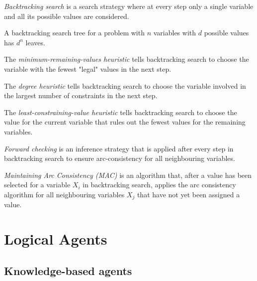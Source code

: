 \documentclass{article}
\begin{document}
\begin{definition}
    \emph{Backtracking search} is a search strategy where at every step only a single
    variable and all its possible values are considered.
\end{definition}

\begin{lemma}
    A backtracking search tree for a problem with $n$ variables with $d$ possible values
    has $d^n$ leaves.
\end{lemma}

\begin{definition}
    The \emph{minimum-remaining-values heuristic} tells backtracking search to choose
    the variable with the fewest "legal" values in the next step.
\end{definition}

\begin{definition}
    The \emph{degree heuristic} tells backtracking search to choose the variable
    involved in the largest number of constraints in the next step.
\end{definition}

\begin{definition}
    The \emph{least-constraining-value heuristic} tells backtracking search to
    choose the value for the current variable that rules out the fewest values
    for the remaining variables.
\end{definition}

\begin{definition}
    \emph{Forward checking} is an inference strategy that is applied after every
    step in backtracking search to ensure arc-consistency for all neighbouring variables.
\end{definition}

\begin{definition}
    \emph{Maintaining Arc Consistency (MAC)} is an algorithm that, after a value has
    been selected for a variable $X_i$ in backtracking search, applies the arc
    consistency algorithm for all neighbouring variables $X_j$ that have not yet
    been assigned a value.
\end{definition}

\section{Logical Agents}

\subsection{Knowledge-based agents}
\end{document}
